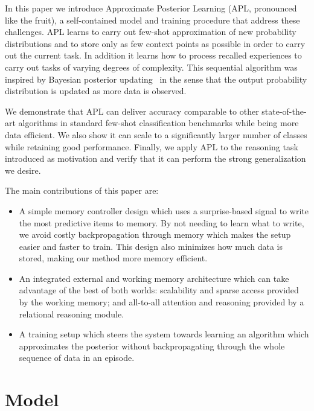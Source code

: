 \documentclass{article} \usepackage{iclr2019_conference,times}
\begin{document}
In this paper we introduce Approximate Posterior Learning (APL, pronounced like the fruit), a self-contained model and training procedure that address these challenges. APL learns to carry out few-shot approximation of new probability distributions and to store only as few context points as possible in order to carry out the current task. In addition it learns how to process recalled experiences to carry out tasks of varying degrees of complexity. This sequential algorithm was inspired by Bayesian posterior updating~\citep{jaynes2003probability} in the sense that the output probability distribution is updated as more data is observed.

We demonstrate that APL can deliver accuracy comparable to other state-of-the-art algorithms in standard few-shot classification benchmarks while being more data efficient. We also show it can scale to a significantly larger number of classes while retaining good performance. Finally, we apply APL to the reasoning task introduced as motivation and verify that it can perform the strong generalization we desire.









The main contributions of this paper are:

\begin{itemize}
    \item A simple memory controller design which uses a surprise-based signal to write the most predictive items to memory. By not needing to learn what to write, we avoid costly backpropagation through memory which makes the setup easier and faster to train. This design also minimizes how much data is stored, making our method more memory efficient.
    \item An integrated external and working memory architecture which can take advantage of the best of both worlds: scalability and sparse access provided by the working memory; and all-to-all attention and reasoning provided by a relational reasoning module.
    \item A training setup which steers the system towards learning an algorithm which approximates the posterior without backpropagating through the whole sequence of data in an episode.
\end{itemize}

\section{Model}
\end{document}
